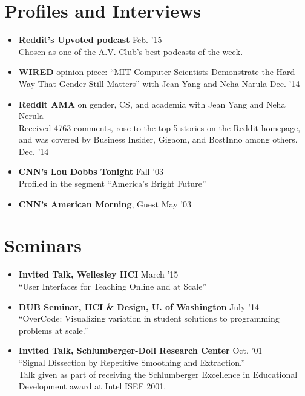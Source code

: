 \documentclass[margin]{res}
\begin{document}
\begin{resume}
\section{Profiles and Interviews}
\begin{itemize}[leftmargin=*] \itemsep -2pt 
\item {\bf Reddit's Upvoted podcast} \hfill Feb. '15 \\ Chosen as one of the A.V. Club's best podcasts of the week.
\item {\bf WIRED} opinion piece: ``MIT Computer Scientists Demonstrate the Hard Way That Gender Still Matters'' with Jean Yang and Neha Narula \hfill Dec. '14
\item {\bf Reddit AMA} on gender, CS, and academia with Jean Yang and Neha Nerula  \\
Received 4763 comments, rose to the top 5 stories on the Reddit homepage, and was covered by Business Insider, Gigaom, and BostInno among others. \hfill Dec. '14
\item \textbf{CNN's Lou Dobbs Tonight}  \hfill Fall '03 \\ Profiled in the segment ``America's Bright Future''
\item \textbf{CNN's American Morning}, Guest \hfill May '03
\end{itemize}

\section{Seminars}

\begin{itemize}[leftmargin=*] \itemsep -2pt
\item {\bf Invited Talk, Wellesley HCI}  \hfill March '15 \\``User Interfaces for Teaching Online and at Scale''

\item {\bf DUB Seminar, HCI \& Design, U. of Washington} \hfill July '14 \\``OverCode: Visualizing variation in student solutions to programming problems at scale.''

\item {\bf Invited Talk, Schlumberger-Doll Research Center} \hfill Oct. '01 \\``Signal Dissection by Repetitive Smoothing and Extraction.'' \\
Talk given as part of receiving the Schlumberger Excellence in Educational Development award at Intel ISEF 2001.
\end{itemize}






\end{resume}
\end{document}

